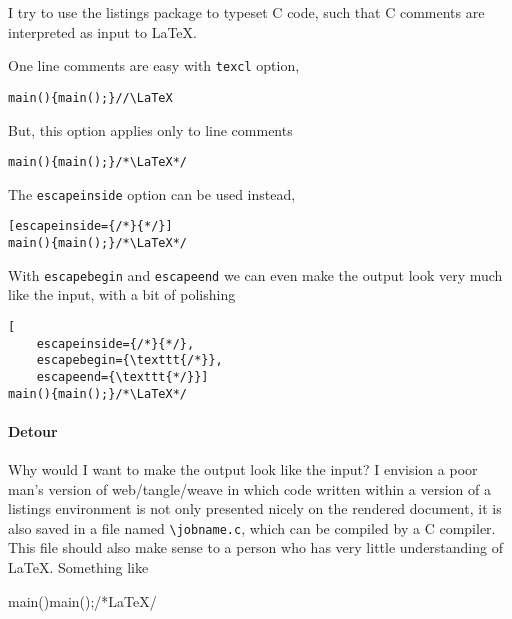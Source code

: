\documentclass{article}
\begin{document}
I try to use the listings package to typeset C code, such that C comments 
are interpreted as input to \LaTeX. 
\begin{LTXexample}
\lstset{language=C}
\end{LTXexample}
One line comments are easy with \verb/texcl/ 
option,

\begin{LTXexample}
\begin{lstlisting}[texcl]
main(){main();}//\LaTeX
\end{lstlisting}
\end{LTXexample}
But, this option applies only to line comments 
\begin{LTXexample}
\begin{lstlisting}[texcl]
main(){main();}/*\LaTeX*/
\end{lstlisting}
\end{LTXexample}
The \verb/escapeinside/ option can be used instead, 
\begin{LTXexample}
 \begin{lstlisting}[escapeinside={/*}{*/}]
main(){main();}/*\LaTeX*/
 \end{lstlisting}
\end{LTXexample}
 With \verb/escapebegin/ and \verb/escapeend/ we can even make the output look 
very much like the input, with a bit of polishing 
\begin{LTXexample}
\begin{lstlisting}[
    escapeinside={/*}{*/},
    escapebegin={\texttt{/*}},
    escapeend={\texttt{*/}}]
main(){main();}/*\LaTeX*/
\end{lstlisting}
\end{LTXexample}
\paragraph{Detour} Why would I want to make the output look like the input? I envision a poor man's version of web/tangle/weave in which code written within a version of a listings
environment is not only presented nicely on the rendered document, it is also saved in a file named \verb/\jobname.c/, which can be compiled by a C compiler.
This file should also make sense to a person who has very little understanding of \LaTeX. Something like 

\begin{LTXexample}
\begin{code}
main(){main();}/*\LaTeX*/
\end{code}
\end{LTXexample}
\end{document}
